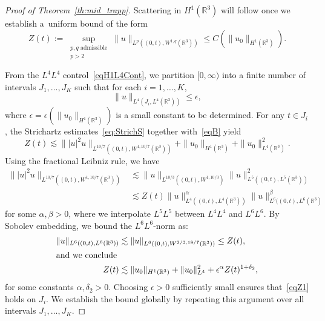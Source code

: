 \documentclass[10pt]{amsart}
\theoremstyle{definition}\newtheorem{defi}[theo]{Definition}\newtheorem{rema}[theo]{Remark}\newtheorem{exam}[theo]{Example}\newtheorem{exem}[theo]{Example}\newtheorem{nota}[theo]{Notation}
\newcommand*\R{\mathbb{R}}
\begin{document}
\begin{proof}[Proof of Theorem~\ref{th:mid_trapp}]
Scattering in $H^1(\R^3) $ will follow once we establish a~uniform bound of the form
\begin{equation}\label{eqZ1}
Z(t) := \sup_{\substack{p, q \text{ admissible}\\ p>2}} \| u \|_{L^p\left((0,t), W^{1,q}(\R^3)\right)} \leq C\left(\| u_0 \|_{H^1(\R^3)}\right).
\end{equation}

From the $L^4L^4$ control~\eqref{eqH1L4Cont}, we partition $[0, \infty)$ into a finite number of intervals $J_1, \dots, J_K $ such that for each $i = 1, \dots, K $,
\begin{equation*}
\| u \|_{L^4(J_i, L^4(\R^3))} \leq \epsilon,
\end{equation*}
where $\epsilon = \epsilon(\| u_0 \|_{H^1(\R^3)})$ is a small constant to be determined. For any $t \in J_i $, the Strichartz estimates~\eqref{eq:StrichS} together with~\eqref{eqB} yield
\begin{equation*}
Z(t) \lesssim \| |u|^2 u \|_{L^{10/7}\left((0,t), W^{1,10/7}(\R^3)\right)} + \| u_0 \|_{H^1(\R^3)} + \| u_0 \|_{L^4(\R^3)}^2.
\end{equation*}
Using the fractional Leibniz rule, we have
\begin{align*}
\| |u|^2 u \|_{L^{10/7}\left((0,t), W^{1,10/7}(\R^3)\right)} & \lesssim \| u \|_{L^{10/3}\left((0,t), W^{1,10/3}\right)} \| u \|_{L^5\left((0,t), L^5(\R^3)\right)}^2 \\
&\lesssim Z(t) \| u \|_{L^4\left((0,t), L^4(\R^3)\right)}^\alpha \| u \|_{L^6((0,t), L^6(\R^3)}^\beta
\end{align*}
for some $\alpha, \beta > 0$, where we interpolate $L^5L^5 $ between $L^4L^4 $ and $L^6L^6 $. By Sobolev embedding, we bound the $L^6L^6 $-norm as:
\begin{align*}
\| u \|_{L^6((0,t), L^6(\R^3))} &\lesssim \| u \|_{L^6((0,t), W^{2/3,18/7}(\R^3))} \leq Z(t),
\\
\intertext{and we conclude}
Z(t) &\lesssim \| u_0 \|_{H^1(\R^3)} + \| u_0 \|_{L^4}^2+ \epsilon^\alpha Z(t)^{1+\delta_2},
\end{align*}
for some constants $\alpha, \delta_2 > 0$. Choosing $\epsilon > 0$ sufficiently small ensures that~\eqref{eqZ1} holds on $J_i $. We establish the bound globally by repeating this argument over all intervals $J_1, \dots, J_K $.


\end{proof}
\end{document}
